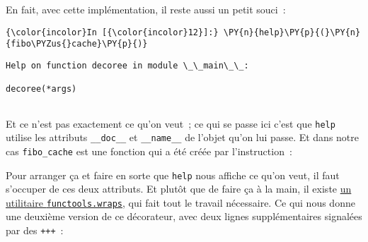     En fait, avec cette implémentation, il reste aussi un petit souci~:

    \begin{Verbatim}[commandchars=\\\{\}]
{\color{incolor}In [{\color{incolor}12}]:} \PY{n}{help}\PY{p}{(}\PY{n}{fibo\PYZus{}cache}\PY{p}{)}
\end{Verbatim}


    \begin{Verbatim}[commandchars=\\\{\}]
Help on function decoree in module \_\_main\_\_:

decoree(*args)


    \end{Verbatim}

    Et ce n'est pas exactement ce qu'on veut~; ce qui se passe ici c'est que
\texttt{help} utilise les attributs \texttt{\_\_doc\_\_} et
\texttt{\_\_name\_\_} de l'objet qu'on lui passe. Et dans notre cas
\texttt{fibo\_cache} est une fonction qui a été créée par
l'instruction~:

\begin{Shaded}
\begin{Highlighting}[]
\OperatorTok{*}
\end{Highlighting}
\end{Shaded}

    Pour arranger ça et faire en sorte que \texttt{help} nous affiche ce
qu'on veut, il faut s'occuper de ces deux attributs. Et plutôt que de
faire ça à la main, il existe
\href{https://docs.python.org/3/library/functools.html\#functools.wraps}{un
utilitaire \texttt{functools.wraps}}, qui fait tout le travail
nécessaire. Ce qui nous donne une deuxième version de ce décorateur,
avec deux lignes supplémentaires signalées par des \texttt{+++}~:

